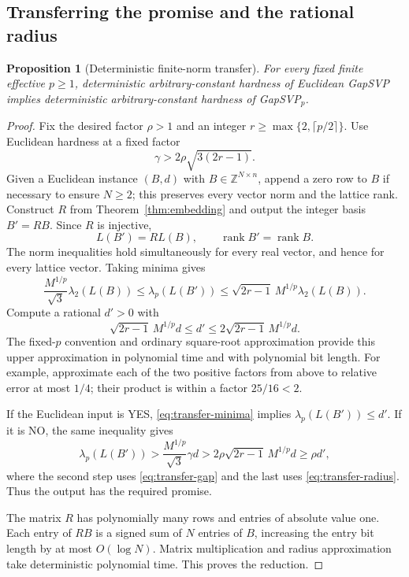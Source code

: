 \documentclass[11pt,letterpaper]{article}
\numberwithin{equation}{section}
\newtheorem{proposition}[theorem]{Proposition}
\theoremstyle{definition}
\theoremstyle{remark}
\DeclareMathOperator{\rank}{rank}
\newcommand{\Z}{\mathbb Z}
\begin{document}
\subsection{Transferring the promise and the rational radius}
\begin{proposition}[Deterministic finite-norm transfer]\label{prop:transfer}
For every fixed finite effective $p\ge1$, deterministic arbitrary-constant hardness of Euclidean GapSVP implies deterministic arbitrary-constant hardness of GapSVP$_p$.
\end{proposition}
\begin{proof}
Fix the desired factor $\rho>1$ and an integer $r\ge\max\{2,\lceil p/2\rceil\}$. Use Euclidean hardness at a fixed factor
\begin{equation}\label{eq:transfer-gap}
 \gamma>2\rho\sqrt{3(2r-1)}.
\end{equation}
Given a Euclidean instance $(B,d)$ with $B\in\Z^{N\times n}$, append a zero row to $B$ if necessary to ensure $N\ge2$; this preserves every vector norm and the lattice rank. Construct $R$ from Theorem~\ref{thm:embedding} and output the integer basis $B'=RB$. Since $R$ is injective,
\[
 L(B')=RL(B),\qquad\rank B'=\rank B.
\]
The norm inequalities hold simultaneously for every real vector, and hence for every lattice vector. Taking minima gives
\begin{equation}\label{eq:transfer-minima}
 \frac{M^{1/p}}{\sqrt3}\lambda_2(L(B))
 \le\lambda_p(L(B'))
 \le\sqrt{2r-1}\,M^{1/p}\lambda_2(L(B)).
\end{equation}
Compute a rational $d'>0$ with
\begin{equation}\label{eq:transfer-radius}
 \sqrt{2r-1}\,M^{1/p}d
 \le d'\le2\sqrt{2r-1}\,M^{1/p}d.
\end{equation}
The fixed-$p$ convention and ordinary square-root approximation provide this upper approximation in polynomial time and with polynomial bit length. For example, approximate each of the two positive factors from above to relative error at most $1/4$; their product is within a factor $25/16<2$.

If the Euclidean input is YES, \eqref{eq:transfer-minima} implies $\lambda_p(L(B'))\le d'$. If it is NO, the same inequality gives
\[
 \lambda_p(L(B'))
 >\frac{M^{1/p}}{\sqrt3}\gamma d
 >2\rho\sqrt{2r-1}\,M^{1/p}d
 \ge\rho d',
\]
where the second step uses \eqref{eq:transfer-gap} and the last uses \eqref{eq:transfer-radius}. Thus the output has the required promise.

The matrix $R$ has polynomially many rows and entries of absolute value one. Each entry of $RB$ is a signed sum of $N$ entries of $B$, increasing the entry bit length by at most $O(\log N)$. Matrix multiplication and radius approximation take deterministic polynomial time. This proves the reduction.
\end{proof}
\end{document}
